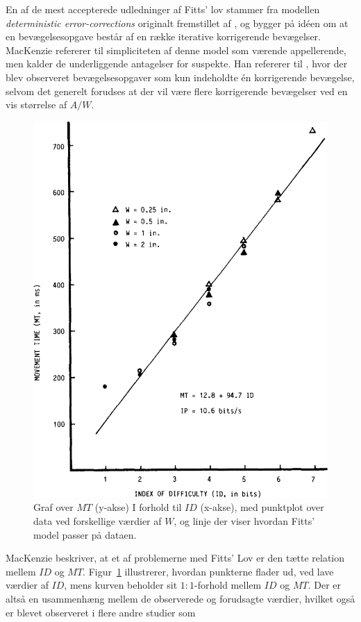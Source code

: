 En af de mest accepterede udledninger af Fitts' lov stammer fra modellen \emph{deterministic error-corrections} originalt fremstillet af \cite{crossman1983}, og bygger på idéen om at en bevægelsesopgave består af en række iterative korrigerende bevægelser. MacKenzie refererer til simpliciteten af denne model som værende appellerende, men kalder de underliggende antagelser for suspekte. Han refererer til \cite{langolf1976}, hvor der blev observeret bevægelsesopgaver som kun indeholdte én korrigerende bevægelse, selvom det generelt forudses at der vil være flere korrigerende bevægelser ved en vis størrelse af $A/W$.\\

\begin{figure}[h]
\centering
\includegraphics[width=.5\linewidth]{images/illustrations/mackenzie_plot_1}
\caption{Graf over $MT$ (y-akse) I forhold til $ID$ (x-akse), med punktplot over data ved forskellige værdier af $W$, og linje der viser hvordan Fitts' model passer på dataen.}
\label{fig:MacKenziePlot1}
\end{figure}
MacKenzie beskriver, at et af problemerne med Fitts' Lov er den tætte relation mellem $ID$ og $MT$. Figur~\ref{fig:MacKenziePlot1} illustrerer, hvordan punkterne flader ud, ved lave værdier af $ID$, mens kurven beholder sit $1:1$-forhold mellem $ID$ og $MT$. Der er altså en usammenhæng mellem de observerede og forudsagte værdier, hvilket også er blevet observeret i flere andre studier som \cite{welford1960, buck1986, crossman1983, drury1975, klapp1975, langolf1976, meyer1988, wallace1978}\\
